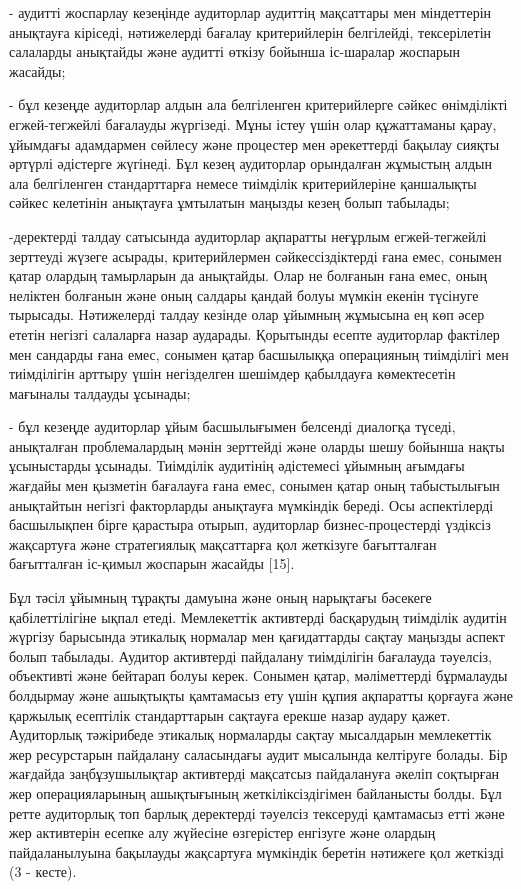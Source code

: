 \begin{multicols}{2}
- аудитті жоспарлау кезеңінде аудиторлар аудиттің мақсаттары мен
міндеттерін анықтауға кіріседі, нәтижелерді бағалау критерийлерін
белгілейді, тексерілетін салаларды анықтайды және аудитті өткізу бойынша
іс-шаралар жоспарын жасайды;

- бұл кезеңде аудиторлар алдын ала белгіленген критерийлерге сәйкес
өнімділікті егжей-тегжейлі бағалауды жүргізеді. Мұны істеу үшін олар
құжаттаманы қарау, ұйымдағы адамдармен сөйлесу және процестер мен
әрекеттерді бақылау сияқты әртүрлі әдістерге жүгінеді. Бұл кезең
аудиторлар орындалған жұмыстың алдын ала белгіленген стандарттарға
немесе тиімділік критерийлеріне қаншалықты сәйкес келетінін анықтауға
ұмтылатын маңызды кезең болып табылады;

-деректерді талдау сатысында аудиторлар ақпаратты неғұрлым
егжей-тегжейлі зерттеуді жүзеге асырады, критерийлермен
сәйкессіздіктерді ғана емес, сонымен қатар олардың тамырларын да
анықтайды. Олар не болғанын ғана емес, оның неліктен болғанын және оның
салдары қандай болуы мүмкін екенін түсінуге тырысады. Нәтижелерді талдау
кезінде олар ұйымның жұмысына ең көп әсер ететін негізгі салаларға назар
аударады. Қорытынды есепте аудиторлар фактілер мен сандарды ғана емес,
сонымен қатар басшылыққа операцияның тиімділігі мен тиімділігін арттыру
үшін негізделген шешімдер қабылдауға көмектесетін мағыналы талдауды
ұсынады;

- бұл кезеңде аудиторлар ұйым басшылығымен белсенді диалогқа түседі,
анықталған проблемалардың мәнін зерттейді және оларды шешу бойынша нақты
ұсыныстарды ұсынады. Тиімділік аудитінің әдістемесі ұйымның ағымдағы
жағдайы мен қызметін бағалауға ғана емес, сонымен қатар оның
табыстылығын анықтайтын негізгі факторларды анықтауға мүмкіндік береді.
Осы аспектілерді басшылықпен бірге қарастыра отырып, аудиторлар
бизнес-процестерді үздіксіз жақсартуға және стратегиялық мақсаттарға қол
жеткізуге бағытталған бағытталған іс-қимыл жоспарын жасайды {[}15{]}.

Бұл тәсіл ұйымның тұрақты дамуына және оның нарықтағы бәсекеге
қабілеттілігіне ықпал етеді. Мемлекеттік активтерді басқарудың тиімділік
аудитін жүргізу барысында этикалық нормалар мен қағидаттарды сақтау
маңызды аспект болып табылады. Аудитор активтерді пайдалану тиімділігін
бағалауда тәуелсіз, объективті және бейтарап болуы керек. Сонымен қатар,
мәліметтерді бұрмалауды болдырмау және ашықтықты қамтамасыз ету үшін
құпия ақпаратты қорғауға және қаржылық есептілік стандарттарын сақтауға
ерекше назар аудару қажет. Аудиторлық тәжірибеде этикалық нормаларды
сақтау мысалдарын мемлекеттік жер ресурстарын пайдалану саласындағы
аудит мысалында келтіруге болады. Бір жағдайда заңбұзушылықтар
активтерді мақсатсыз пайдалануға әкеліп соқтырған жер операцияларының
ашықтығының жеткіліксіздігімен байланысты болды. Бұл ретте аудиторлық
топ барлық деректерді тәуелсіз тексеруді қамтамасыз етті және жер
активтерін есепке алу жүйесіне өзгерістер енгізуге және олардың
пайдаланылуына бақылауды жақсартуға мүмкіндік беретін нәтижеге қол
жеткізді (3 - кесте).
\end{multicols}

